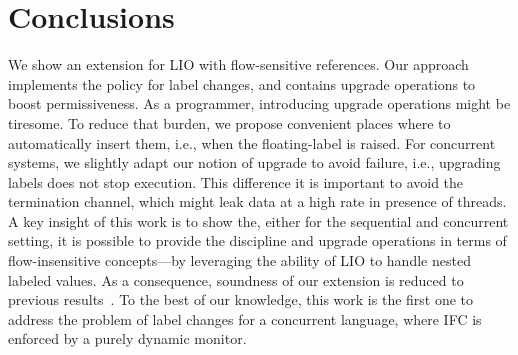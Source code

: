 \section{Conclusions}

We show an extension for LIO with flow-sensitive references. Our approach
implements the {\nsu} policy for label changes, and contains upgrade operations
to boost permissiveness. As a programmer, introducing upgrade operations might
be tiresome. To reduce that burden, we propose convenient places where to
automatically insert them, i.e., when the floating-label is raised. For
concurrent systems, we slightly adapt our notion of upgrade to avoid failure,
i.e., upgrading labels does not stop execution. This difference it is important
to avoid the termination channel, which might leak data at a high rate in
presence of threads. A key insight of this work is to show the, either for the
sequential and concurrent setting, it is possible to provide the {\nsu}
discipline and upgrade operations in terms of flow-insensitive concepts---by
leveraging the ability of LIO to handle nested labeled values. As a consequence,
soundness of our extension is reduced to previous
results~\cite{stefan:lio,stefan:addressing-covert}. To the best of our
knowledge, this work is the first one to address the problem of label changes
for a concurrent language, where IFC is enforced by a purely dynamic
monitor.

